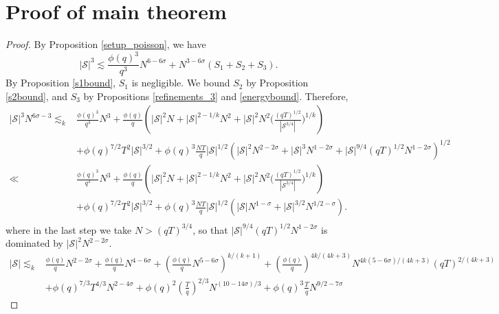 \section{Proof of main theorem}
\begin{proof}
    By Proposition \ref{setup_poisson}, we have\[
        |\mathcal{S}|^3\lesssim \frac{\phi(q)^3}{q^3}N^{6-6\sigma}+ N^{3-6\sigma}(S_1+S_2+S_3).
    \]
    By Proposition \ref{s1bound}, $S_1$ is negligible. We bound $S_2$ by Proposition \ref{s2bound}, and $S_3$ by Propositions \ref{refinements_3} and \ref{energybound}. Therefore, \begin{align*}
        |\mathcal{S}|^3N^{6\sigma-3}\lesssim_k &\frac{\phi(q)^3}{q^3}N^{3}+ \frac{\phi(q)}{q}\left(|\mathcal{S}|^2N+|\mathcal{S}|^{2-1/k}N^2+|\mathcal{S}|^2N^2\Big(\frac{(qT)^{1/2}}{|\mathcal{S}^{3/4}|}\Big)^{1/k}\right)\\
        &+\phi(q)^{7/2}T^2|\mathcal{S}|^{3/2}+\phi(q)^{3}\frac{NT}{q}|\mathcal{S}|^{1/2}(|\mathcal{S}|^2N^{2-2\sigma}+ |\mathcal{S}|^3N^{1-2\sigma} + |\mathcal{S}|^{9/4}(qT)^{1/2}N^{{1-2\sigma}})^{1/2}\\
        \ll &\frac{\phi(q)^3}{q^3}N^{3}+ \frac{\phi(q)}{q}\left(|\mathcal{S}|^2N+|\mathcal{S}|^{2-1/k}N^2+|\mathcal{S}|^2N^2\Big(\frac{(qT)^{1/2}}{|\mathcal{S}^{3/4}|}\Big)^{1/k}\right)\\
        &+\phi(q)^{7/2}T^2|\mathcal{S}|^{3/2}+\phi(q)^{3}\frac{NT}{q}|\mathcal{S}|^{1/2}(|\mathcal{S}|N^{1-\sigma}+ |\mathcal{S}|^{3/2}N^{1/2-\sigma} ).\\
    \end{align*}
    where in the last step we take $N>(qT)^{3/4}$, so that $|\mathcal{S}|^{9/4}(qT)^{1/2}N^{{1-2\sigma}}$ is dominated by $|\mathcal{S}|^2N^{2-2\sigma}$. 
    \begin{align*}
        |\mathcal{S}|\lesssim_k & \frac{\phi(q)}{q}N^{2-2\sigma} + \frac{\phi(q)}{q}N^{4-6\sigma} + \left(\frac{\phi(q)}{q} N^{5-6\sigma}\right)^{k/(k+1)}+\left(\frac{\phi(q)}{q}\right)^{4k/(4k+3)}N^{4k(5-6\sigma)/(4k+3)}(qT)^{2/(4k+3)}\\
        & + {\phi(q)}^{7/3}T^{4/3}N^{2-4\sigma}+\phi(q)^{2}\left(\frac{T}{q}\right)^{2/3}N^{(10-14\sigma)/3}  +\phi(q)^{3}\frac{T}{q}N^{9/2-7\sigma} 
    \end{align*}

\end{proof}